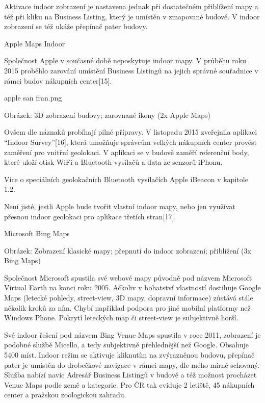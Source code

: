 Aktivace indoor zobrazení je nastavena jednak při dostatečném přiblížení mapy a též při kliku na Business Listing, který je umístěn v zmapované budově. V indoor zobrazení se též ukáže přepínač pater budovy.

Apple Maps Indoor



Společnost Apple v současné době neposkytuje indoor mapy. V průběhu roku 2015 proběhlo zarování umístění Business Listingů na jejich správné souřadnice v rámci budov nákupních center[15].

apple san fran.png

Obrázek: 3D zobrazení budovy; zarovnané ikony (2x Apple Maps)

Ovšem dle náznaků probíhají pilné přípravy. V listopadu 2015 zveřejnila aplikaci “Indoor Survey”[16], která umožňuje správcům velkých nákupních center provést zaměření pro vnitřní geolokaci. V aplikaci se v budově zaměří referenční body, které uloží otisk WiFi a Bluetooth vysílačů a data ze senzorů iPhonu.

Vice o speciálních geolokačních Bluetooth vysílačích Apple iBeacon v kapitole 1.2.

Není jisté, jestli Apple bude tvořit vlastní indoor mapy, nebo jen využívat přesnou indoor geolokaci pro aplikace třetích stran[17].

Microsoft Bing Maps





Obrázek: Zobrazení klasické mapy; přepnutí do indoor zobrazení; přiblížení (3x Bing Maps)

Společnost Microsoft spustila své webové mapy původně pod názvem Microsoft Virtual Earth na konci roku 2005. Ačkoliv v bohatství vlastností dostihuje Google Maps (letecké pohledy, street-view, 3D mapy, dopravní informace) zůstává stále několik kroků za ním. Chybí například podpora pro jiné mobilní platformy než Windows Phone. Pokrytí leteckých map či street-view je subjektivně horší.

Své indoor řešení pod názvem Bing Venue Maps spustila v roce 2011, zobrazení je podobné službě Micello, a tedy subjektivně přehlednější než Google. Obsahuje 5400 míst. Indoor režim se aktivuje kliknutím na zvýrazněnou budovu, přepínač pater je umístěn do drobečkové navigace v rámci mapy, dle mého mírně schovaný. Služba nabízí navíc Adresář Business Listingů v budově a též možnost procházet Venue Maps podle země a kategorie. Pro ČR tak eviduje 2 letiště, 45 nákupních center a pražskou zoologickou zahradu.

